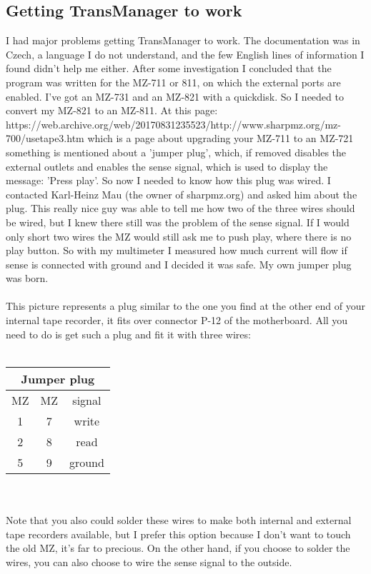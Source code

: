 \subsection{Getting TransManager to work}
I had major problems getting TransManager to work. The documentation was in 
Czech, a language I do not understand, and the few English lines of information
I found didn't help me either. After some investigation I concluded that the
program was written for the MZ-711 or 811, on which the external ports are 
enabled. I've got an MZ-731 and an MZ-821 with a quickdisk. So I needed to 
convert my MZ-821 to an MZ-811. At this page: \\
https://web.archive.org/web/20170831235523/http://www.sharpmz.org/mz-700/usetape3.htm
which is a page about upgrading your MZ-711 to an MZ-721 something is mentioned
about a 'jumper plug', which, if removed disables the external outlets and
enables the sense signal, which is used to display the message: 'Press play'.
So now I needed to know how this plug was wired. I contacted Karl-Heinz Mau
\cite{MZ} (the owner of sharpmz.org)
and asked him about the plug. This really nice guy was able to tell me how 
two of the three wires should be wired, but I knew there still was the problem
of the sense signal. If I would only short two wires the MZ would still ask
me to push play, where there is no play button. So with my multimeter I
measured how much current will flow if sense is connected with ground and I
decided it was safe. My own jumper plug was born. \\
 \\
This picture represents a plug similar to the one you find at the other end
of your internal tape recorder, it fits over connector P-12 of the motherboard.
All you need to do is get such a plug and fit it with three wires: \\ \\
\begin{tabular}{c|c|c}
\multicolumn{3}{c}{Jumper plug} \\
\hline
MZ & MZ & signal \\
\hline
1 & 7 & write \\
2 & 8 & read \\
5 & 9 & ground \\
\end{tabular} \\ \\
Note that you also could solder these wires to make both internal and external
tape recorders available, but I prefer this option because I don't want to 
touch the old MZ, it's far to precious. On the other hand, if you choose to
solder the wires, you can also choose to wire the sense signal to the outside.

